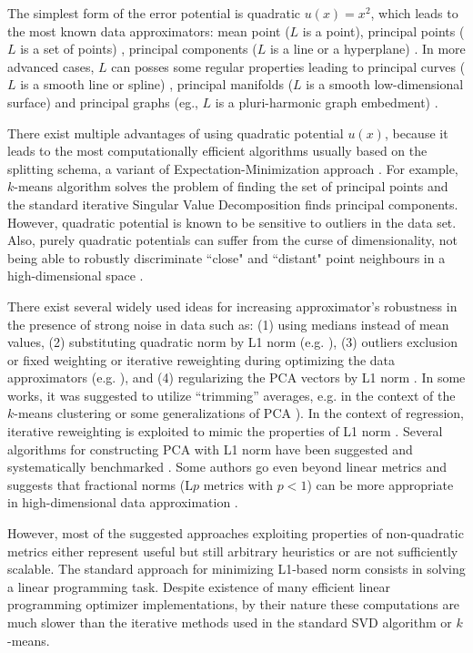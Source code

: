 \documentclass[preprint,12pt,twocolumn]{elsarticle}
\begin{document}
The simplest form of the error potential is quadratic $u(x)=x^2$, which leads to the most known data approximators: mean point ($L$ is a point), principal points ($L$ is a set of points) \cite{Flury1990}, principal components ($L$ is a line or a hyperplane) \cite{Pearson1901On}. In more advanced cases, $L$ can posses some regular properties leading to principal curves ($L$ is a smooth line or spline) \cite{Hastie1984}, principal manifolds ($L$ is a smooth low-dimensional surface) and principal graphs (eg., $L$ is a pluri-harmonic graph embedment) \cite{gorban2007topological,Gorban2009}.

There exist multiple advantages of using quadratic potential $u(x)$, because it leads to the most computationally efficient algorithms usually based on the splitting schema, a variant of Expectation-Minimization approach \cite{Gorban2009}. For example, $k$-means algorithm solves the problem of finding the set of principal points and the standard iterative Singular Value Decomposition finds principal components. However, quadratic potential is known to be sensitive to outliers in the data set. Also, purely quadratic potentials can suffer from the curse of dimensionality, not being able to robustly discriminate ``close" and ``distant" point neighbours in a high-dimensional space \cite{Aggarwal2001}.

There exist several widely used ideas for increasing approximator's robustness in the presence of strong noise in data such as: (1) using medians instead of mean values, (2) substituting quadratic norm by L1 norm (e.g. \cite{Ding2006, hauberg2014}), (3) outliers exclusion or fixed weighting or iterative reweighting during optimizing the data approximators (e.g. \cite{Xu1995,Allende2004,kohonen2001self}), and (4) regularizing the PCA vectors by L1 norm \cite{Jolliffe2003,Candes2011,Zou2006}. In some works, it was suggested to utilize ``trimming'' averages, e.g. in the context of the $k$-means clustering or some generalizations of PCA \cite{cuesta1997,hauberg2014}). In the context of regression, iterative reweighting is exploited to mimic the properties of L1 norm \cite{Lu2015}. Several algorithms for constructing PCA with L1 norm have been suggested \cite{Ke2005,Kwak2008,Brooks2013} and systematically benchmarked \cite{brooks2012pcal1,Park2014}. Some authors go even beyond linear metrics and suggests that fractional norms (L$p$ metrics with $p<1$) can be more appropriate in high-dimensional data approximation \cite{Aggarwal2001}.

However, most of the suggested approaches exploiting properties of non-quadratic metrics either represent useful but still arbitrary heuristics or are not sufficiently scalable. The standard approach for minimizing L1-based norm consists in solving a linear programming task. Despite existence of many efficient linear programming optimizer implementations, by their nature these computations are much slower than the iterative methods used in the standard SVD algorithm or $k$-means.
\end{document}
